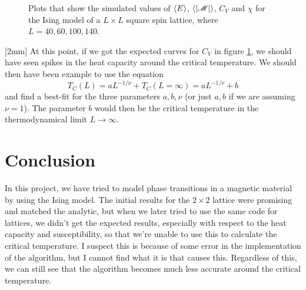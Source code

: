 \documentclass[12pt,a4paper]{article}
\newcommand\M[1]{\begin{bmatrix} #1 \end{bmatrix}} %
\def\M{\mathscr{M}}
\newcommand\oppg[1]{\reversemarginnote{\textcolor{black!40}{#1)}}[2mm]}
\begin{document}
\begin{figure}[!ht]

  \caption{Plots that show the simulated values of $\expval{E}$, $\expval{|\M|}$, $C_V$ and $\chi$ for the Ising model of a $L \times L$ square spin lattice, where $L = 40,60,100,140$.} \label{fig:e}
\end{figure}

\oppg{f}
At this point, if we got the expected curves for $C_V$ in figure \ref{fig:e}, we should have seen spikes in the heat capacity around the critical temperature. We should then have been example to use the equation
\begin{equation}
  T_C(L) = a L^{-1/\nu} + T_C(L = \infty) = a L^{-1/\nu} + b
\end{equation}
and find a best-fit for the three parameters $a,b,\nu$ (or just $a,b$ if we are assuming $\nu = 1$). The parameter $b$ would then be the critical temperature in the thermodynamical limit $L \to \infty$.

\clearpage
\section{Conclusion}
In this project, we have tried to model phase transitions in a magnetic material by using the Ising model. The initial results for the $2 \times 2$ lattice were promising and matched the analytic, but when we later tried to use the same code for lattices, we didn't get the expected results, especially with respect to the heat capacity and susceptibility, so that we're unable to use this to calculate the critical temperature. I suspect this is because of some error in the implementation of the algorithm, but I cannot find what it is that causes this. Regardless of this, we can still see that the algorithm becomes much less accurate around the critical temperature.
\end{document}
